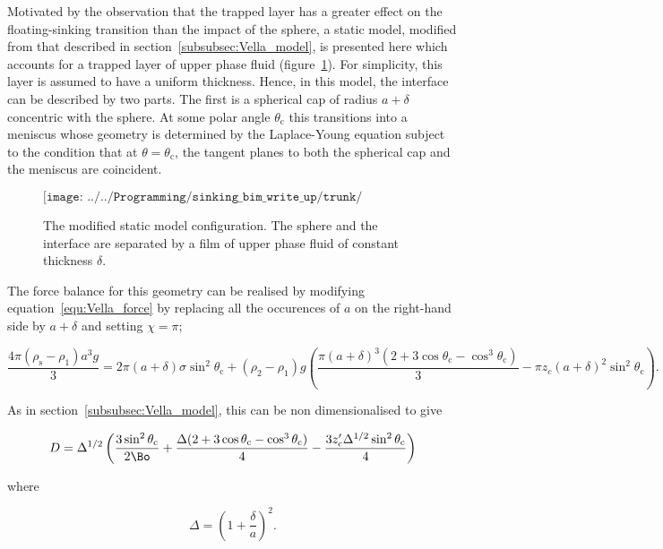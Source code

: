 {Motivated by the observation that the trapped layer has a greater effect on the floating-sinking transition than the impact of the sphere, a static model, modified from that described in section~\ref{subsubsec:Vella_model}, is presented here which accounts for a trapped layer of upper phase fluid (figure~\ref{fig:mod_stat_mod}). For simplicity, this layer is assumed to have a uniform thickness. Hence, in this model, the interface can be described by two parts. The first is a spherical cap of radius $a + \delta$ concentric with the sphere. At some polar angle $\theta_{\text{c}}$ this transitions into a meniscus whose geometry is determined by the Laplace-Young equation subject to the condition that at $\theta = \theta_{\text{c}}$, the tangent planes to both the spherical cap and the meniscus are coincident. 

\begin{figure}
  $$\texttt{[image: ../../Programming/sinking\_bim\_write\_up/trunk/mod\_stat\_mod.eps]}$$
  \caption{The modified static model configuration. The sphere and the interface are separated by a film of upper phase fluid of constant thickness $\delta$. \label{fig:mod_stat_mod}}
\end{figure}

The force balance for this geometry can be realised by modifying equation~\ref{equ:Vella_force} by replacing all the occurences of $a$ on the right-hand side by $a + \delta$ and setting $\chi = \pi$;

\begin{equation}
\label{equ:mod_force}
\frac{4 \pi (\rho_{\text{s}} - \rho_{1}) a^{3} g}{3} = 2 \pi (a + \delta) \sigma \sin^{2} \theta_{\text{c}} + (\rho_{2} - \rho_{1}) g \left(\frac{\pi (a + \delta)^{3} (2 + 3 \cos \theta_{\text{c}} - \cos^{3} \theta_{\text{c}})}{3} - \pi z_{c} (a + \delta)^{2} \sin^{2} \theta_{\text{c}} \right).
\end{equation}

As in section~\ref{subsubsec:Vella_model}, this can be non dimensionalised to give

\begin{equation}
\label{equ:mod_non_dim}
D = \Delta^{1/2} \left(\frac{3 \sin^{2} \theta_{\text{c}}}{2 \Bo} + \frac{\Delta (2 + 3 \cos \theta_{\text{c}} - \cos^{3} \theta_{\text{c}})}{4} - \frac{3 z'_{\text{c}} \Delta^{1/2} \sin^{2} \theta_{\text{c}}}{4}\right)
\end{equation}

where

\begin{equation}
\label{equ:non_dim_film}
\Delta = \left(1 + \frac{\delta}{a}\right)^{2}.
\end{equation}

}
